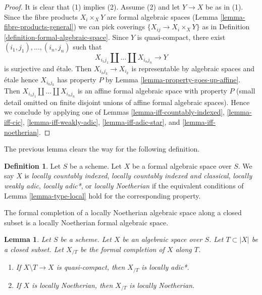 \documentclass{stacks-project}
\theoremstyle{plain}
\newtheorem{lemma}[subsection]{Lemma}
\theoremstyle{definition}
\newtheorem{definition}[subsection]{Definition}
\theoremstyle{remark}
\numberwithin{equation}{subsection}
\begin{document}
\begin{proof}
It is clear that (1) implies (2). Assume (2) and let
$Y \to X$ be as in (1). Since the fibre products $X_i \times_X Y$
are formal algebraic spaces (Lemma \ref{lemma-fibre-products-general})
we can pick coverings $\{X_{ij} \to X_i \times_X Y\}$ as in
Definition \ref{definition-formal-algebraic-space}.
Since $Y$ is quasi-compact, there exist
$(i_1, j_1), \ldots, (i_n, j_n)$ such that
$$
X_{i_1 j_1} \amalg \ldots \amalg X_{i_n j_n} \longrightarrow Y
$$
is surjective and \'etale. Then $X_{i_kj_k} \to X_{i_k}$ is representable
by algebraic spaces and \'etale hence $X_{i_kj_k}$ has property $P$ by
Lemma \ref{lemma-property-goes-up-affine}.
Then $X_{i_1 j_1} \amalg \ldots \amalg X_{i_n j_n}$ is an
affine formal algebraic space with property $P$ (small detail
omitted on finite disjoint unions of affine formal algebraic spaces).
Hence we conclude by applying one of
Lemmas \ref{lemma-iff-countably-indexed},
\ref{lemma-iff-cic},
\ref{lemma-iff-weakly-adic},
\ref{lemma-iff-adic-star}, and
\ref{lemma-iff-noetherian}.
\end{proof}

\noindent
The previous lemma clears the way for the following definition.

\begin{definition}
\label{definition-types-formal-algebraic-spaces}
Let $S$ be a scheme. Let $X$ be a formal algebraic space over $S$.
We say $X$ is
{\it locally countably indexed},
{\it locally countably indexed and classical},
{\it locally weakly adic},
{\it locally adic*}, or
{\it locally Noetherian}
if the equivalent conditions of Lemma \ref{lemma-type-local}
hold for the corresponding property.
\end{definition}

\noindent
The formal completion of a locally Noetherian algebraic space
along a closed subset is a locally Noetherian formal algebraic space.

\begin{lemma}
\label{lemma-formal-completion-types}
Let $S$ be a scheme. Let $X$ be an algebraic space over $S$.
Let $T \subset |X|$ be a closed subset. Let $X_{/T}$ be the
formal completion of $X$ along $T$.
\begin{enumerate}
\item If $X \setminus T \to X$ is quasi-compact,
then $X_{/T}$ is locally adic*.
\item If $X$ is locally Noetherian, then $X_{/T}$ is locally
Noetherian.
\end{enumerate}
\end{lemma}
\end{document}
